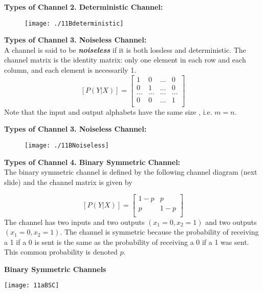 
\noindent \textbf{Types of Channel}
\textbf{2. Deterministic Channel:}\\
\begin{figure}
\centering
\texttt{[image: ./11Bdeterministic]}
\caption{}
\label{fig:11Bdeterministic}
\end{figure}




\noindent \textbf{Types of Channel}
\textbf{3. Noiseless Channel:}\\
A channel is said to be \emph{\textbf{noiseless}} if it is both lossless and deterministic.
The channel matrix is the identity matrix: only one element in each row and each column, and each element is necessarily 1.
\[  [P(Y|X)]  = \left[ \begin{array}{cccc}
1 &0 & \ldots & 0 \\
0 & 1& \ldots & 0 \\
\ldots & \ldots & \ldots & \ldots \\
0& 0 & \ldots & 1 \\
\end{array} \right] \]
Note that the input and output alphabets have the same size , i.e. $m=n$.


\noindent \textbf{Types of Channel}
\textbf{3. Noiseless Channel:}\\
\begin{figure}
\centering
\texttt{[image: ./11BNoiseless]}
\caption{}
\label{fig:11BNoiseless}
\end{figure}



\noindent \textbf{Types of Channel}
\textbf{4. Binary Symmetric Channel:}\\
The binary symmetric channel is defined by the following channel diagram (next slide) and the channel matrix is given by

\[  [P(Y|X)]  = \left[ \begin{array}{cc}
1-p & p  \\
p & 1-p\\
\end{array} \right] \]
The channel has two inputs and two outputs $(x_1=0,x_2=1)$ and two outputs $(x_1=0,x_2=1)$. The channel is symmetric because the probability of receiving a 1 if a 0 is sent is the same as the probability of receiving a 0 if a 1 was sent. This common probability is denoted $p$.


{
\noindent \textbf{Binary Symmetric Channels}

\begin{center}
\texttt{[image: 11aBSC]}
\end{center}
}

